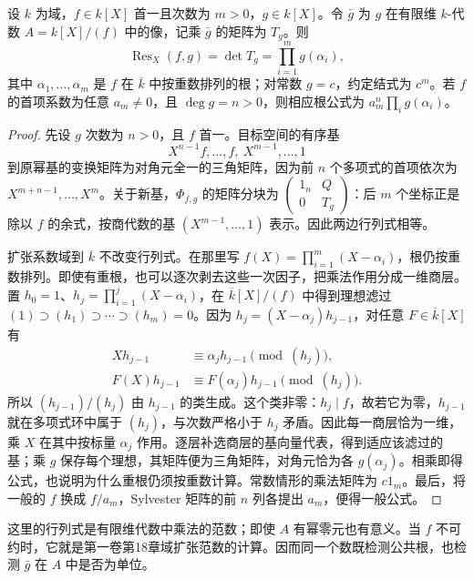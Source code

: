 \begin{proposition}\label{b3:prop:resultant-norm}
	设 \(k\) 为域，\(f\in k[X]\) 首一且次数为 \(m>0\)，\(g\in k[X]\)。令 \(\bar g\) 为 \(g\) 在有限维 \(k\)-代数 \(A=k[X]/(f)\) 中的像，记乘 \(\bar g\) 的矩阵为 \(T_g\)。则
	\[
		\operatorname{Res}_X(f,g)=\det T_g =\prod_{i=1}^m g(\alpha_i),
	\]
	其中 \(\alpha_1,\ldots,\alpha_m\) 是 \(f\) 在 \(\overline k\) 中按重数排列的根；对常数 \(g=c\)，约定结式为 \(c^m\)。若 \(f\) 的首项系数为任意 \(a_m\ne0\)，且 \(\deg g=n>0\)，则相应根公式为 \(a_m^n\prod_i g(\alpha_i)\)。
\end{proposition}
\begin{proof}
	先设 \(g\) 次数为 \(n>0\)，且 \(f\) 首一。目标空间的有序基
	\[
		X^{n-1}f,\ldots,f,\ X^{m-1},\ldots,1
	\]
	到原幂基的变换矩阵为对角元全一的三角矩阵，因为前 \(n\) 个多项式的首项依次为 \(X^{m+n-1},\ldots,X^m\)。关于新基，\(\Phi_{f,g}\) 的矩阵分块为 \(\left(\begin{smallmatrix}1_n&Q\\0&T_g\end{smallmatrix}\right)\)：后 \(m\) 个坐标正是除以 \(f\) 的余式，按商代数的基 \((X^{m-1},\ldots,1)\) 表示。因此两边行列式相等。

	扩张系数域到 \(\overline k\) 不改变行列式。在那里写 \(f(X)=\prod_{i=1}^m(X-\alpha_i)\)，根仍按重数排列。即使有重根，也可以逐次剥去这些一次因子，把乘法作用分成一维商层。置 \(h_0=1\)、\(h_j=\prod_{i=1}^j(X-\alpha_i)\)，在 \(\overline k[X]/(f)\) 中得到理想滤过 \((1)\supset(h_1)\supset\cdots\supset(h_m)=0\)。因为 \(h_j=(X-\alpha_j)h_{j-1}\)，对任意 \(F\in\overline k[X]\) 有
	\[
		\begin{aligned}
			Xh_{j-1}&\equiv\alpha_jh_{j-1}\pmod{(h_j)},\\
			F(X)h_{j-1}&\equiv F(\alpha_j)h_{j-1}\pmod{(h_j)}.
		\end{aligned}
	\]
	所以 \((h_{j-1})/(h_j)\) 由 \(h_{j-1}\) 的类生成。这个类非零：\(h_j\mid f\)，故若它为零，\(h_{j-1}\) 就在多项式环中属于 \((h_j)\)，与次数严格小于 \(h_j\) 矛盾。因此每一商层恰为一维，乘 \(X\) 在其中按标量 \(\alpha_j\) 作用。逐层补选商层的基向量代表，得到适应该滤过的基；乘 \(g\) 保存每个理想，其矩阵便为三角矩阵，对角元恰为各 \(g(\alpha_j)\)。相乘即得公式，也说明为什么重根仍须按重数计算。常数情形的乘法矩阵为 \(c1_m\)。最后，将一般的 \(f\) 换成 \(f/a_m\)，Sylvester 矩阵的前 \(n\) 列各提出 \(a_m\)，便得一般公式。
\end{proof}

这里的行列式是有限维代数中乘法的范数；即使 \(A\) 有幂零元也有意义。当 \(f\) 不可约时，它就是第一卷第18章域扩张范数的计算。因而同一个数既检测公共根，也检测 \(\bar g\) 在 \(A\) 中是否为单位。

